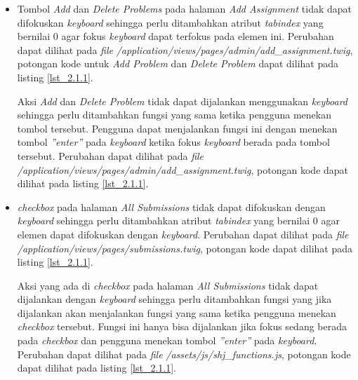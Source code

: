 \begin{itemize}
	\item Tombol \textit{Add} dan \textit{Delete Problems} pada halaman \textit{Add Assignment} tidak dapat difokuskan \textit{keyboard} sehingga perlu ditambahkan atribut \textit{tabindex} yang bernilai 0 agar fokus \textit{keyboard} dapat terfokus pada elemen ini. Perubahan dapat dilihat pada \textit{file} \textit{/application/views/pages/admin/add\_assignment.twig}, potongan kode untuk \textit{Add Problem} dan \textit{Delete Problem} dapat dilihat pada listing \ref{lst_2.1.1}.

	Aksi \textit{Add} dan \textit{Delete Problem} tidak dapat dijalankan menggunakan \textit{keyboard} sehingga perlu ditambahkan fungsi yang sama ketika pengguna menekan tombol tersebut. Pengguna dapat menjalankan fungsi ini dengan menekan tombol \textit{''enter''} pada \textit{keyboard} ketika fokus \textit{keyboard} berada pada tombol tersebut. Perubahan dapat dilihat pada \textit{file} \textit{/application/views/pages/admin/add\_assignment.twig}, potongan kode dapat dilihat pada listing \ref{lst_2.1.1}.

	\item \textit{checkbox} pada halaman \textit{All Submissions} tidak dapat difokuskan dengan \textit{keyboard} sehingga perlu ditambahkan atribut \textit{tabindex} yang bernilai 0 agar elemen dapat difokuskan dengan \textit{keyboard}. Perubahan dapat dilihat pada \textit{file} \textit{/application/views/pages/submissions.twig}, potongan kode dapat dilihat pada listing \ref{lst_2.1.1}.
	
	Aksi yang ada di \textit{checkbox} pada halaman \textit{All Submissions} tidak dapat dijalankan dengan \textit{keyboard} sehingga perlu ditambahkan fungsi yang jika dijalankan akan menjalankan fungsi yang sama ketika pengguna menekan \textit{checkbox} tersebut. Fungsi ini hanya bisa dijalankan jika fokus sedang berada pada \textit{checkbox} dan pengguna menekan tombol \textit{''enter''} pada \textit{keyboard}. Perubahan dapat dilihat pada \textit{file} \textit{/assets/js/shj\_functions.js}, potongan kode dapat dilihat pada listing \ref{lst_2.1.1}.


\end{itemize}
